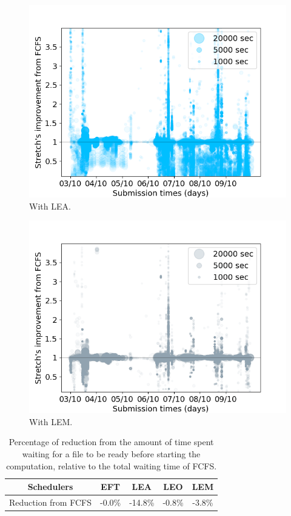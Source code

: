 \documentclass[sigconf,review,anonymous]{acmart}
\begin{document}
\begin{figure}[t]\centering\includegraphics[width=0.9\linewidth]{../MBSS/plot/Stretch_times/Stretch_times_FCFS_LEA_2022-10-03->2022-10-09_V10000_anonymous_450_128_32_256_4_1024.png}\caption{With LEA.}\label{40_fcfs_vs_lea}\end{figure}
\begin{figure}[t]\centering\includegraphics[width=0.9\linewidth]{../MBSS/plot/Stretch_times/Stretch_times_FCFS_LEM_2022-10-03->2022-10-09_V10000_anonymous_450_128_32_256_4_1024.png}\caption{With LEM.}\label{40_fcfs_vs_lem}\end{figure}
\begin{table}
\begin{tabular}{ |c|c|c|c|c| }
  \hline
  Schedulers & EFT & LEA & LEO & LEM \\
  \hline
  Reduction from FCFS & -0.0\% & -14.8\% & -0.8\% & -3.8\% \\ %
  \hline
\end{tabular}
\caption{Percentage of reduction from the amount of time spent 
waiting for a file to be ready before starting the computation,
relative to the total waiting time of FCFS.}\label{tab.40}
\end{table}
\end{document}

